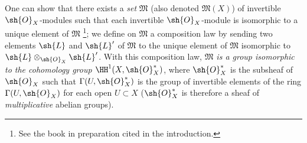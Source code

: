 \begin{env}[5.4.7]
\label{0.5.4.7}
One can show that there exists a \emph{set} $\mathfrak{M}$ (also denoted $\mathfrak{M}(X)$) of invertible $\sh{O}_X$-modules such that each invertible $\sh{O}_X$-module is isomorphic to a unique element of $\mathfrak{M}$
\footnote{See the book in preparation cited in the introduction.};
we define on $\mathfrak{M}$ a composition law by sending two elements $\sh{L}$ and $\sh{L}'$ of $\mathfrak{M}$ to the unique element of $\mathfrak{M}$ isomorphic to $\sh{L}\otimes_{\sh{O}_X}\sh{L}'$.
With this composition law, \emph{$\mathfrak{M}$ is a group isomorphic to the cohomology group $\HH^1(X,\sh{O}_X^*)$}, where $\sh{O}_X^*$ is the subsheaf of $\sh{O}_X$ such that $\Gamma(U,\sh{O}_X^*)$ is the group of invertible elements of the ring $\Gamma(U,\sh{O}_X)$ for each open $U\subset X$ ($\sh{O}_X^*$ is therefore a sheaf of \emph{multiplicative} abelian groups).


\end{env}
